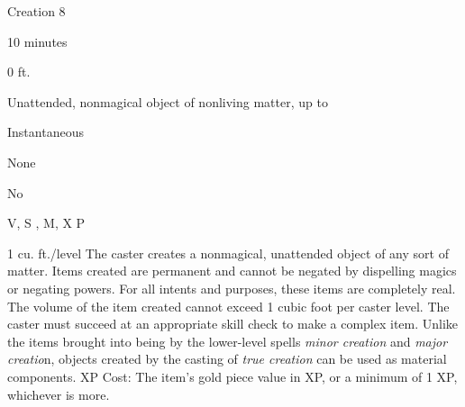 
\begin{description*}
\item[Level:] Creation 8
\item[Casting Time:] 10 minutes
\item[Range:] 0 ft.
\item[Effect:] Unattended, nonmagical object of nonliving matter, up to
\item[Duration:] Instantaneous
\item[Saving Throw:] None
\item[Spell Resistance:] No
\item[Components:] V, S , M, X P
\end{description*}

1 cu. ft./level
The caster creates a nonmagical, unattended object of any sort of matter. Items
created are permanent and cannot be negated by dispelling magics or negating powers.
For all intents and purposes, these items are completely real. The volume of the
item created cannot exceed 1 cubic foot per caster level. The caster must succeed
at an appropriate skill check to make a complex item.
Unlike the items brought into being by the lower-level spells \textit{minor creation
}and \textit{major creatio}n, objects created by the casting of \textit{true creation
}can be used as material components.
XP Cost: The item's gold piece value in XP, or a minimum of 1 XP, whichever
is more.